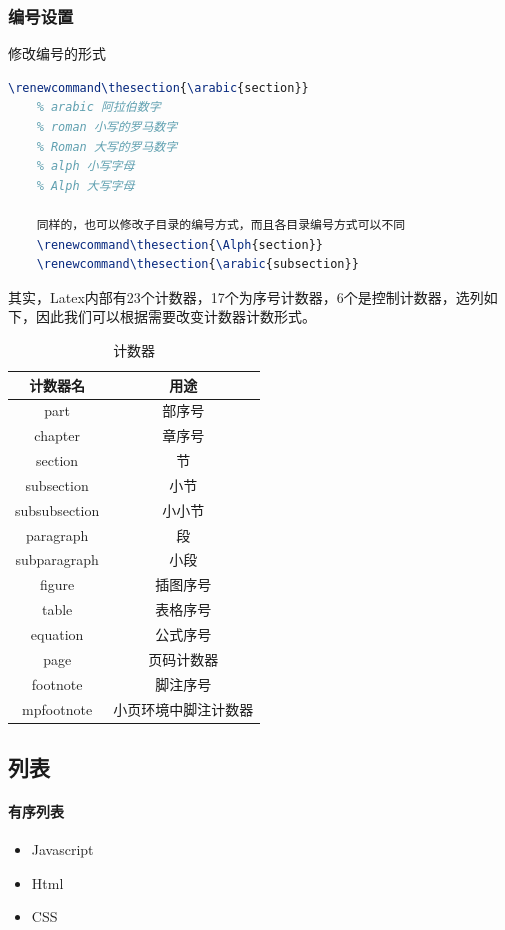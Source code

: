 \subsubsection{编号设置}
修改编号的形式
\begin{lstlisting}[language={TeX}]
    \renewcommand\thesection{\arabic{section}} 
    % arabic 阿拉伯数字 
    % roman 小写的罗马数字 
    % Roman 大写的罗马数字 
    % alph 小写字母 
    % Alph 大写字母
    
    同样的，也可以修改子目录的编号方式，而且各目录编号方式可以不同
    \renewcommand\thesection{\Alph{section}} 
    \renewcommand\thesection{\arabic{subsection}}
\end{lstlisting}
其实，Latex内部有23个计数器，17个为序号计数器，6个是控制计数器，选列如下，因此我们可以根据需要改变计数器计数形式。
\begin{table}[h]
    \centering
    \begin{tabular}{|c|c|}
    \hline
    计数器名          & 用途         \\ \hline
    part          & 部序号        \\ \hline
    chapter       & 章序号        \\ \hline
    section       & 节          \\ \hline
    subsection    & 小节         \\ \hline
    subsubsection & 小小节        \\ \hline
    paragraph     & 段          \\ \hline
    subparagraph  & 小段         \\ \hline
    figure        & 插图序号       \\ \hline
    table         & 表格序号       \\ \hline
    equation      & 公式序号       \\ \hline
    page          & 页码计数器      \\ \hline
    footnote      & 脚注序号       \\ \hline
    mpfootnote    & 小页环境中脚注计数器 \\ \hline
    \end{tabular}
    \caption{计数器}
    \label{tab:mytab0}
\end{table}

\subsection{列表}

\paragraph{有序列表}
\begin{itemize}
  \item Javascript
  \item Html
  \item CSS
\end{itemize}

